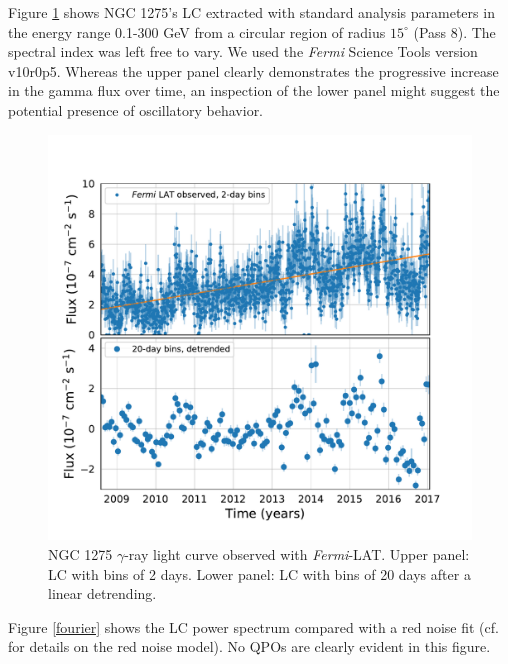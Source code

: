 \documentclass{iau}
\begin{document}
Figure \ref{lc} shows NGC 1275's LC extracted with standard analysis parameters in the energy range 0.1-300 GeV from a circular region of radius $15^{\circ}$ (Pass 8). The spectral index was left free to vary. We used the \textit{Fermi} Science Tools version v10r0p5. Whereas the upper panel clearly demonstrates the progressive increase in the gamma flux over time, an inspection of the lower panel might suggest the potential presence of oscillatory behavior. 

\begin{figure}[h]
\begin{center}
\includegraphics[width=0.7\linewidth]{observations.pdf} 
\caption{NGC 1275 $\gamma$-ray light curve observed with \textit{Fermi}-LAT. Upper panel: LC with bins of 2 days. Lower panel: LC with bins of 20 days after a linear detrending.}
\label{lc}
\end{center}
\end{figure}

Figure \ref{fourier} shows the LC power spectrum compared with a red noise fit (cf. \cite[Torrence \& Compo 1998]{Torrence1998} for details on the red noise model). 
No QPOs are clearly evident in this figure.
\end{document}
